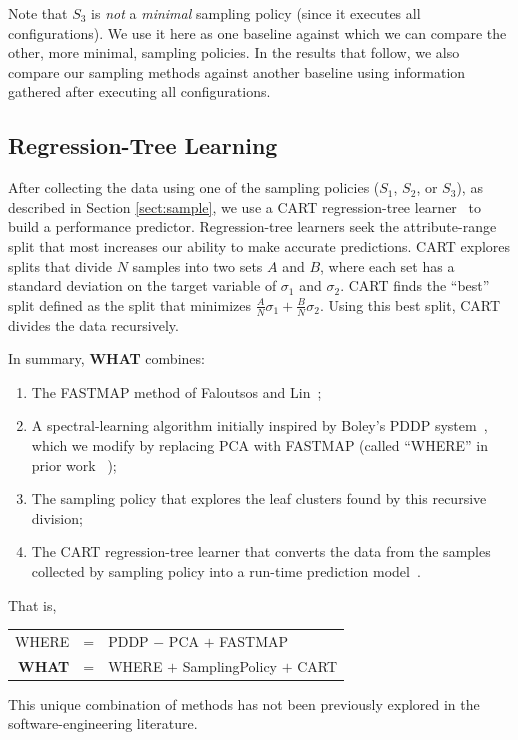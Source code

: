 \documentclass{newsig}
\newcommand{\what}{{\bf WHAT }}
\begin{document}
Note that $S_3$ is {\em not} a {\em minimal} sampling policy (since it executes all configurations). 
We use it here as one  baseline
against which we can compare the other, more minimal, sampling policies. In the results
that follow, we also compare our 
sampling methods against another baseline using information gathered after executing
all configurations.

\subsection{Regression-Tree Learning}
After collecting the data using one of the sampling policies ($S_1$, $S_2$, or $S_3$), as described in Section \ref{sect:sample}, we  use a CART regression-tree learner~\cite{breiman1984} to build a performance predictor. Regression-tree learners seek the attribute-range split that most increases
our ability to make accurate predictions.
CART explores splits that divide $N$ samples  into two sets  $A$ and $B$, where each set  has a  standard deviation on the target variable of $\sigma_1$ and  $\sigma_2$.
CART finds the ``best'' split defined as the split that minimizes $\frac{A}{N}\sigma_1 + \frac{B}{N}\sigma_2$.
Using this best split, CART divides the data recursively.
 

In summary, \what  combines:
\begin{enumerate}
\item
The FASTMAP method of Faloutsos and Lin~\cite{Faloutsos1995};

\item A spectral-learning algorithm initially   inspired by    Boley's PDDP system~\cite{boley98}, which we modify
by replacing  PCA with FASTMAP (called
``WHERE'' in prior work ~\cite{me12d});

\item
The sampling policy that explores the leaf clusters found by this recursive division;

\item 
The CART regression-tree learner that converts the data from the samples collected by sampling policy 
into a run-time prediction model~\cite{breiman1984}.
\end{enumerate}
That is,
\begin{center}
\begin{tabular}{rcl}
WHERE& = &PDDP $-$ PCA $+$ FASTMAP\\[1.5ex] 
\what& =  & WHERE $+$ SamplingPolicy $+$ CART
\end{tabular}
\end{center}
This unique combination of methods has not been previously explored in the
software-engineering literature.
\end{document}
